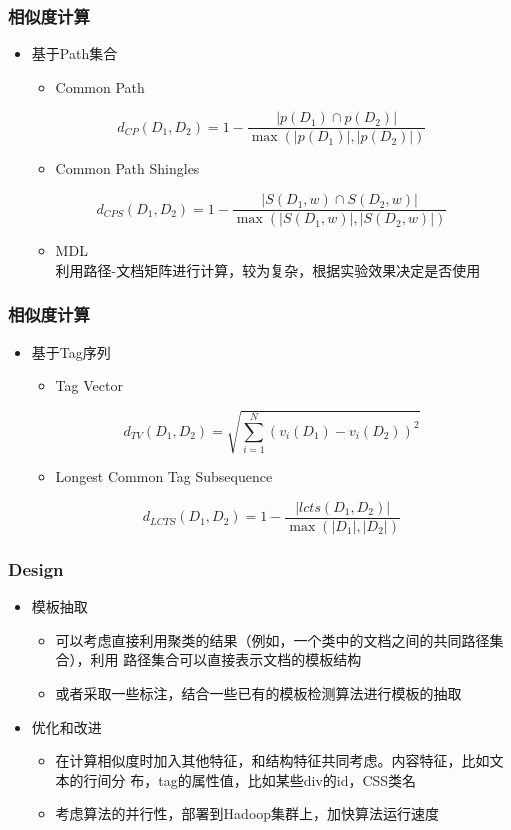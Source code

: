\documentclass[11pt,presentation]{beamer}
\begin{document}
\begin{frame}
\frametitle{相似度计算}
\label{sec-2-5}
\begin{itemize}

\item 基于Path集合
\label{sec-2-5-1}%
\begin{itemize}
\item Common Path
\end{itemize}
\[
d_{CP}(D_1,D_2)=1-\frac{|p(D_1)\cap p(D_2)|}{\max (|p(D_1)|, |p(D_2)|)}
\]
\begin{itemize}
\item Common Path Shingles
\end{itemize}
\[
d_{CPS}(D_1,D_2)=1-\frac{|S(D_1,w)\cap S(D_2,w)|}{\max (|S(D_1,w)|, |S(D_2,w)|)}
\]
\begin{itemize}
\item MDL\cite{6}\\
利用路径-文档矩阵进行计算，较为复杂，根据实验效果决定是否使用
\end{itemize}
\end{itemize} %
\end{frame}
\begin{frame}
\frametitle{相似度计算}
\label{sec-2-6}
\begin{itemize}

\item 基于Tag序列
\label{sec-2-6-1}%
\begin{itemize}
\item Tag Vector
\end{itemize}
\[
d_{TV}(D_1,D_2)=\sqrt{\sum_{i=1}^N(v_i(D_1)-v_i(D_2))^2}
\]
\begin{itemize}
\item Longest Common Tag Subsequence
\end{itemize}
\[
d_{LCTS}(D_1,D_2)=1-\frac{|lcts(D_1,D_2)|}{\max(|D_1|,|D_2|)}
\]
\end{itemize} %
\end{frame}
\begin{frame}
\frametitle{Design}
\label{sec-2-7}
\begin{itemize}

\item 模板抽取
\label{sec-2-7-1}%
\begin{itemize}
\item 可以考虑直接利用聚类的结果（例如，一个类中的文档之间的共同路径集合），利用
      路径集合可以直接表示文档的模板结构
\item 或者采取一些标注，结合一些已有的模板检测算法进行模板的抽取
\end{itemize}

\item 优化和改进
\label{sec-2-7-2}%
\begin{itemize}
\item 在计算相似度时加入其他特征，和结构特征共同考虑。内容特征，比如文本的行间分
      布，tag的属性值，比如某些div的id，CSS类名
\item 考虑算法的并行性，部署到Hadoop集群上，加快算法运行速度
\end{itemize}
\end{itemize} %
\end{frame}
\end{document}
